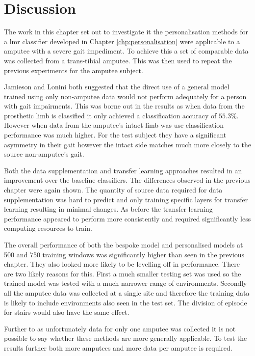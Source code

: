 \section{Discussion}
\label{sec:amputee-discussion}
The work in this chapter set out to investigate it the personalisation methods for a \acrshort{lmr} classifier developed in Chapter \ref{chp:personalisation} were applicable to a amputee with a severe gait impediment. To achieve this a set of comparable data was collected from a trans-tibial amputee. This was then used to repeat the previous experiments for the amputee subject.

Jamieson and Lonini both suggested that the direct use of a general model trained using only non-amputee data would not perform adequately for a person with gait impairments\cite{Lonini2016, Jamieson2021}. This was borne out in the results as when data from the prosthetic limb is classified it only achieved a classification accuracy of $55.3\%$. However when data from the amputee's intact limb was use classification performance was much higher. For the test subject they have a significant asymmetry in their gait however the intact side matches much more closely to the source non-amputee's gait.

Both the data supplementation and transfer learning approaches resulted in an improvement over the baseline classifiers. The differences observed in the previous chapter were again shown. The quantity of source data required for data supplementation was hard to predict and only training specific layers for transfer learning resulting in minimal changes. As before the transfer learning performance appeared to perform more consistently and required significantly less computing resources to train.

The overall performance of both the bespoke model and personalised models at 500 and 750 training windows was significantly higher than seen in the previous chapter. They also looked more likely to be levelling off in performance. There are two likely reasons for this. First a much smaller testing set was used so the trained model was tested with a much narrower range of environments. Secondly all the amputee data was collected at a single site and therefore the training data is likely to include environments also seen in the test set. The division of episode for stairs would also have the same effect. 

Further to as unfortunately data for only one amputee was collected it is not possible to say whether these methods are more generally applicable. To test the results further both more amputees and more data per amputee is required. 


